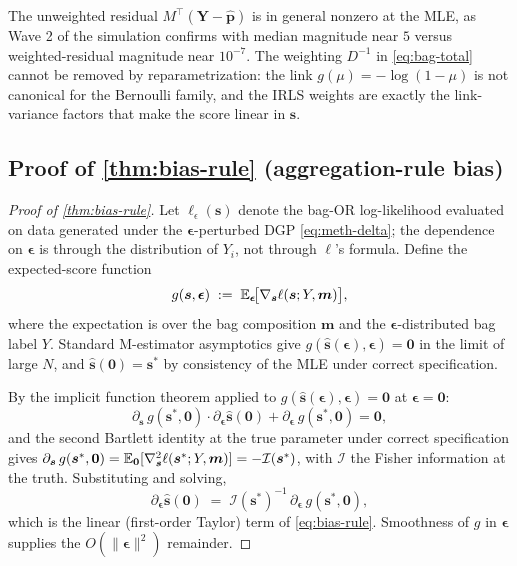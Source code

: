 \begin{remark}
The unweighted residual $M^\top(\bm Y - \hat{\bm p})$ is in general
nonzero at the MLE, as Wave 2 of the simulation confirms with
median magnitude near $5$ versus weighted-residual magnitude near
$10^{-7}$. The weighting $D^{-1}$ in \eqref{eq:bag-total} cannot be
removed by reparametrization: the link
$g(\mu) = -\log(1-\mu)$ is not canonical for the Bernoulli family,
and the IRLS weights are exactly the link-variance factors that
make the score linear in $\bm s$.
\end{remark}

\subsection{Proof of \cref{thm:bias-rule} (aggregation-rule bias)}
\label{app:proof-bias-rule}

\begin{proof}[Proof of \cref{thm:bias-rule}]
Let $\ell_\epsilon(\bm s)$ denote the bag-OR log-likelihood
evaluated on data generated under the $\bm\epsilon$-perturbed
DGP \eqref{eq:meth-delta}; the dependence on $\bm\epsilon$ is
through the distribution of $Y_i$, not through $\ell$'s formula.
Define the expected-score function
\begin{equation}
  g(\bm s, \bm\epsilon) \;:=\;
  \mathbb{E}_{\bm\epsilon}\!\big[\nabla_{\bm s} \ell(\bm s; Y, \bm m)\big],
\end{equation}
where the expectation is over the bag composition $\bm m$ and the
$\bm\epsilon$-distributed bag label $Y$. Standard M-estimator
asymptotics give $g(\hat{\bm s}(\bm\epsilon), \bm\epsilon) = \bm 0$
in the limit of large $N$, and $\hat{\bm s}(\bm 0) = \bm s^*$ by
consistency of the MLE under correct specification.

By the implicit function theorem applied to
$g(\hat{\bm s}(\bm\epsilon), \bm\epsilon) = \bm 0$ at
$\bm\epsilon = \bm 0$:
\begin{equation}
  \partial_{\bm s}\, g(\bm s^*, \bm 0)
   \cdot \partial_{\bm\epsilon} \hat{\bm s}(\bm 0)
   + \partial_{\bm\epsilon}\, g(\bm s^*, \bm 0)
   = \bm 0,
   \label{eq:app-implicit-diff}
\end{equation}
and the second Bartlett identity at the true parameter under
correct specification gives
$\partial_{\bm s}\, g(\bm s^*, \bm 0) = \mathbb{E}_{\bm 0}[\nabla^2_{\bm s}
\ell(\bm s^*; Y, \bm m)] = -\mathcal{I}(\bm s^*)$, with
$\mathcal{I}$ the Fisher information at the truth. Substituting and
solving,
\begin{equation}
  \partial_{\bm\epsilon} \hat{\bm s}(\bm 0)
   \;=\; \mathcal{I}(\bm s^*)^{-1}\,
         \partial_{\bm\epsilon}\, g(\bm s^*, \bm 0),
\end{equation}
which is the linear (first-order Taylor) term of
\eqref{eq:bias-rule}. Smoothness of $g$ in $\bm\epsilon$ supplies
the $O(\|\bm\epsilon\|^2)$ remainder. \qedhere
\end{proof}

